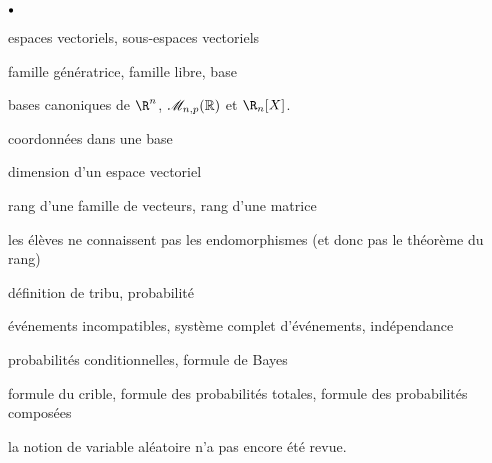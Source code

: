 \documentclass[11pt]{article}%
\begin{document}
\begin{noliste}{$\scriptstyle \bullet$}
\item espaces vectoriels, sous-espaces vectoriels
\item famille génératrice, famille libre, base
\item bases canoniques de $\R^n$, $\mathscr{M}_{n,p}(\mathbb{R})$ et $\R_n[X]$.
\item coordonnées dans une base
\item dimension d'un espace vectoriel
\item rang d'une famille de vecteurs, rang d'une matrice
\item \warn les élèves ne connaissent pas les endomorphismes (et donc 
pas le théorème du rang)
\item définition de tribu, probabilité
\item événements incompatibles, système complet d'événements, 
indépendance
\item probabilités conditionnelles, formule de Bayes
\item formule du crible, formule des probabilités totales, formule 
des probabilités composées
\item la notion de variable aléatoire n'a pas encore été revue.
\end{noliste}
\end{document}
